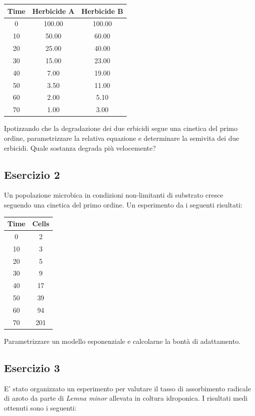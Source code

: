 \documentclass[a4paper,12pt,oneside]{book}
\begin{document}
\begin{longtable}[]{@{}ccc@{}}
\toprule
Time & Herbicide A & Herbicide B \\
\midrule
\endhead
0 & 100.00 & 100.00 \\
10 & 50.00 & 60.00 \\
20 & 25.00 & 40.00 \\
30 & 15.00 & 23.00 \\
40 & 7.00 & 19.00 \\
50 & 3.50 & 11.00 \\
60 & 2.00 & 5.10 \\
70 & 1.00 & 3.00 \\
\bottomrule
\end{longtable}

Ipotizzando che la degradazione dei due erbicidi segue una cinetica del primo ordine, parametrizzare la relativa equazione e determinare la semivita dei due erbicidi. Quale sostanza degrada più velocemente?

\hypertarget{esercizio-2-9}{%
\subsection{Esercizio 2}\label{esercizio-2-9}}

Un popolazione microbica in condizioni non-limitanti di substrato cresce seguendo una cinetica del primo ordine. Un esperimento da i seguenti risultati:

\begin{longtable}[]{@{}cc@{}}
\toprule
Time & Cells \\
\midrule
\endhead
0 & 2 \\
10 & 3 \\
20 & 5 \\
30 & 9 \\
40 & 17 \\
50 & 39 \\
60 & 94 \\
70 & 201 \\
\bottomrule
\end{longtable}

Parametrizzare un modello esponenziale e calcolarne la bontà di adattamento.

\hypertarget{esercizio-3-8}{%
\subsection{Esercizio 3}\label{esercizio-3-8}}

E' stato organizzato un esperimento per valutare il tasso di assorbimento radicale di azoto da parte di \emph{Lemna minor} allevata in coltura idroponica. I risultati medi ottenuti sono i seguenti:
\end{document}

